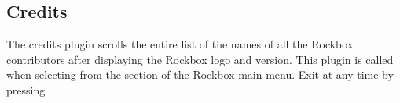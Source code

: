 \subsection{Credits}
The credits plugin scrolls the entire list of the names of all the Rockbox
contributors after displaying the Rockbox logo and version. This plugin is
called when selecting  from the  section of
the Rockbox main menu. Exit at any time by pressing \ActionStdCancel.
